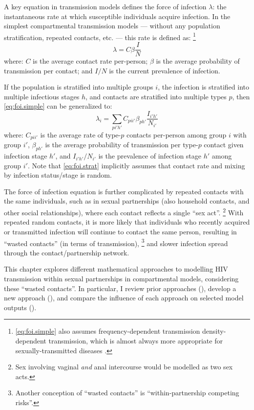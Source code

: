 A key equation in transmission models defines the force of infection $\lambda$:
the instantaneous rate at which susceptible individuals acquire infection.
In the simplest compartmental transmission models
--- \ie without any population stratification, repeated contacts, etc. ---
this rate is defined as:%
\footnote{\eqref{eq:foi.simple} also assumes
  frequency-dependent transmission \vs density-dependent transmission,
  which is almost always more appropriate for sexually-transmitted diseases \cite{Begon2002}.}
\begin{equation}\label{eq:foi.simple}
  \lambda = C \beta \frac{I}{N}
\end{equation}
where:
$C$ is the average contact rate per-person;
$\beta$ is the average probability of transmission per contact; and
$I/N$ is the current prevalence of infection.
\par
If the population is stratified into multiple groups $i$,
the infection is stratified into multiple infectious stages $h$,
and contacts are stratified into multiple types $p$,
then \eqref{eq:foi.simple} can be generalized to:
\begin{equation}\label{eq:foi.strat}
  \lambda_i = \sum_{pi'h'} C_{pii'} \beta_{ph'} \frac{I_{i'h'}}{N_{i'}}
\end{equation}
where:
$C_{pii'}$ is the average rate of type-$p$ contacts per-person among group $i$ with group $i'$,
$\beta_{ph'}$ is the average probability of transmission per type-$p$ contact given infection stage $h'$,
and $I_{i'h'}/N_{i'}$ is the prevalence of infection stage $h'$ among group $i'$.
Note that \eqref{eq:foi.strat} implicitly assumes that
contact rate and mixing by infection status/stage is random.
\par
The force of infection equation is further complicated by
repeated contacts with the same individuals, such as in sexual partnerships
(also household contacts, and other social relationships),
where each contact reflects a single ``sex act''.%
\footnote{Sex involving vaginal \emph{and} anal intercourse would be modelled as two sex acts.}
With repeated \vs random contacts, it is more likely that
individuals who recently acquired or transmitted infection will continue to contact the same person,
resulting in ``wasted contacts'' (in terms of transmission),%
\footnote{Another conception of ``wasted contacts'' is ``within-partnership competing risks''.}
and slower infection spread through the contact/partnership network.
\par
This chapter explores different mathematical approaches to
modelling HIV transmission within sexual partnerships in compartmental models,
considering these ``wasted contacts''.
In particular, I review prior approaches (),
develop a new approach (),
and compare the influence of each approach on selected model outputs ().
